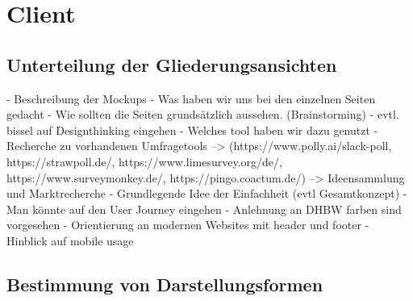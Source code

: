 \section{Client}

\subsection{Unterteilung der Gliederungsansichten}

	- Beschreibung der Mockups
		- Was haben wir uns bei den einzelnen Seiten gedacht
		- Wie sollten die Seiten grundsätzlich aussehen. (Brainstorming)
		- evtl. bissel auf Designthinking eingehen
		- Welches tool haben wir dazu genutzt
	- Recherche zu vorhandenen Umfragetools --> (https://www.polly.ai/slack-poll, https://strawpoll.de/, https://www.limesurvey.org/de/, https://www.surveymonkey.de/, https://pingo.coactum.de/)
		--> Ideensammlung und Marktrecherche
	- Grundlegende Idee der Einfachheit (evtl Gesamtkonzept)
	- Man könnte auf den User Journey eingehen
	- Anlehnung an DHBW farben sind vorgesehen
	- Orientierung an modernen Websites mit header und footer
	- Hinblick auf mobile usage
	
\subsection{Bestimmung von Darstellungsformen}